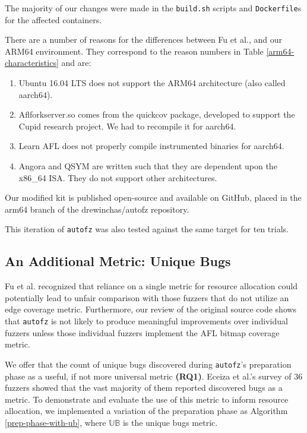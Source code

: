 The majority of our changes were made in the \texttt{build.sh} scripts and \texttt{Dockerfile}s
for the affected containers.

There are a number of reasons for the differences between Fu et al.,
and our ARM64 environment. They correspond to the reason numbers in Table 
\ref{arm64-characteristics} and are:

\begin{enumerate}
    \item Ubuntu 16.04 LTS does not support the ARM64 architecture (also called 
    aarch64).
    \item Aflforkserver.so comes from the quickcov package, developed to support 
    the Cupid research project\cite{guler_cupid_2020}. We had to recompile it for aarch64.
    \item Learn AFL does not properly compile instrumented binaries for aarch64.
    \item Angora and QSYM are written such that they are dependent upon the x86\_64 ISA.
    They do not support other architectures.
\end{enumerate}

Our modified kit is published open-source and available on GitHub, 
\cite{noauthor_drewinchasautofz_nodate} placed in the arm64 branch 
of the drewinchas/autofz repository.

This iteration of \texttt{autofz} was also tested against the same target for ten trials.

\subsection{An Additional Metric: Unique Bugs}

Fu et al.\cite{fu_autofz_2023} recognized that reliance on a single metric for resource 
allocation could potentially lead to unfair comparison with those fuzzers that do not 
utilize an edge coverage metric. Furthermore, our review of the original source 
code shows that \texttt{autofz} is not likely to produce meaningful improvements over individual 
fuzzers unless those individual fuzzers implement the AFL bitmap coverage metric.

We offer that the count of unique bugs discovered during \texttt{autofz}'s preparation phase 
as a useful, if not more universal metric \textbf{(RQ1)}. Eceiza et al.\cite{eceiza_improving_2023}'s 
survey of 36 fuzzers showed that the vast majority of them reported discovered 
bugs as a metric. To demonstrate and evaluate the use of this metric to inform resource allocation, we 
implemented a variation of the preparation phase as Algorithm \ref{prep-phase-with-ub}, 
where $\mathbb{UB}$ is the unique bugs metric.

